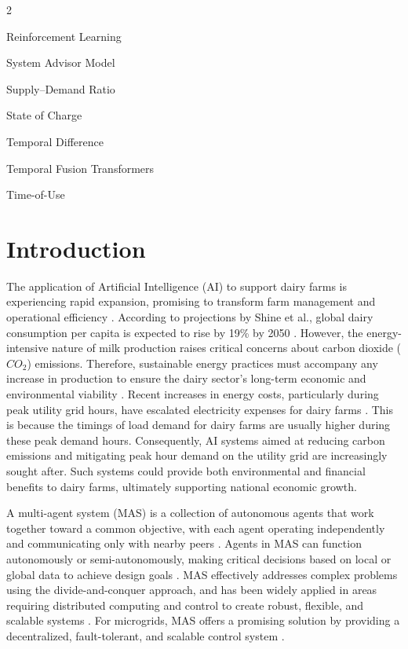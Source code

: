 \documentclass[preprint,12pt]{elsarticle}
\newcommand{\tlabel}[1]{\textbf{#1}}
\begin{document}
\begin{multicols}{2}
\begin{description}[leftmargin=1.4em, labelsep=0.6em, itemsep=0.25ex, parsep=0ex, topsep=0.2ex]
\item[\tlabel{RL}] Reinforcement Learning
\item[\tlabel{SAM}] System Advisor Model
\item[\tlabel{SDR}] Supply–Demand Ratio
\item[\tlabel{SoC}] State of Charge
\item[\tlabel{TD}] Temporal Difference
\item[\tlabel{TFT}] Temporal Fusion Transformers
\item[\tlabel{ToU}] Time-of-Use

\end{description}
\end{multicols}







\section{Introduction}
\label{introduction}



The application of Artificial Intelligence (AI) to support dairy farms is experiencing rapid expansion, promising to transform farm management and operational efficiency \cite{de2023invited}. According to projections by Shine et al., global dairy consumption per capita is expected to rise by 19\% by 2050 \cite{shine2020energy}. However, the energy-intensive nature of milk production raises critical concerns about carbon dioxide ($CO_2$) emissions. Therefore, sustainable energy practices must accompany any increase in production to ensure the dairy sector’s long-term economic and environmental viability \cite{ben2017renewable}. Recent increases in energy costs, particularly during peak utility grid hours, have escalated electricity expenses for dairy farms \cite{upton2015investment}. This is because the timings of load demand for dairy farms are usually higher during these peak demand hours. Consequently, AI systems aimed at reducing carbon emissions and mitigating peak hour demand on the utility grid are increasingly sought after. Such systems could provide both environmental and financial benefits to dairy farms, ultimately supporting national economic growth.

A multi-agent system (MAS) is a collection of autonomous agents that work together toward a common objective, with each agent operating independently and communicating only with nearby peers \cite{adjerid2020multi, dorri2018multi}. Agents in MAS can function autonomously or semi-autonomously, making critical decisions based on local or global data to achieve design goals \cite{nair2018multi}. MAS effectively addresses complex problems using the divide-and-conquer approach, and has been widely applied in areas requiring distributed computing and control to create robust, flexible, and scalable systems \cite{shobole2021multiagent}. For microgrids, MAS offers a promising solution by providing a decentralized, fault-tolerant, and scalable control system \cite{elena2022multi}.
\end{document}
